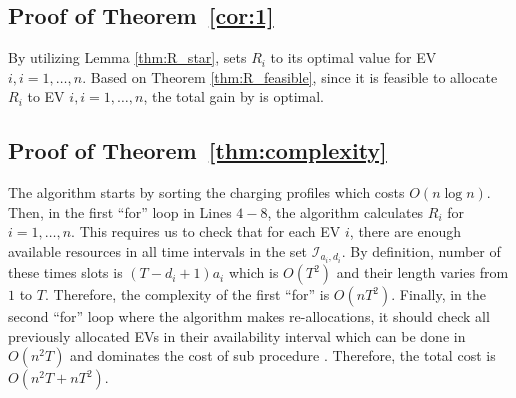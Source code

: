 	


\vspace{-3mm}		
		
				
\subsection{Proof of Theorem~\ref{cor:1}}
			\label{app:4}
			By utilizing Lemma \ref{thm:R_star}, \fcs sets $R_i$ to its optimal value for EV $i, i=1,\dots ,n$. Based on Theorem \ref{thm:R_feasible}, since it is feasible to allocate $R_i$ to EV $i, i=1,\dots ,n$, the total gain by \fcs is optimal. 
			
\vspace{-3mm}
\subsection{Proof of Theorem~\ref{thm:complexity}}
			\label{app:5}
			The algorithm starts by sorting the charging profiles which costs $O(n\log n)$. Then, in the first 
			``for'' loop in Lines $4-8$, the algorithm calculates $R_i$ for $i=1,\dots ,n$. This requires us to check that for each EV $i$, there are enough available resources in all time intervals in the set $\mathcal{I}_{a_i,d_i}$. By definition, number of these times slots is $(T-d_i+1)a_i$ which is $O(T^2)$ and their length varies from $1$ to $T$. Therefore, the complexity of the first ``for'' is $O(nT^2)$. Finally, in the second ``for'' loop where the algorithm makes re-allocations, it should check all previously allocated EVs in their availability interval which can be done in $O(n^2T)$ and dominates the cost of sub procedure \sa. Therefore, the total cost is $O(n^2T+nT^2)$. 
			
\vspace{-3mm}


